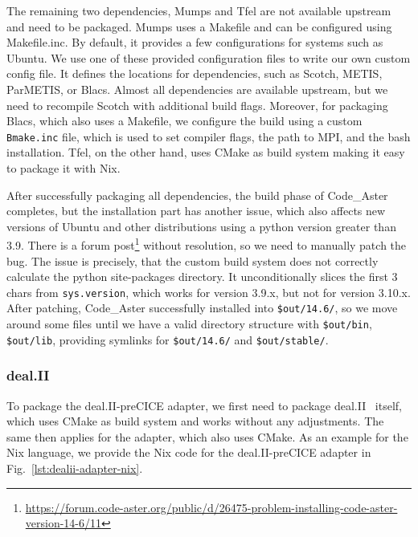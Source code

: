 \documentclass{eceasst}
\begin{document}
The remaining two dependencies, Mumps and Tfel are not available upstream and need to be packaged.
Mumps uses a Makefile and can be configured using Makefile.inc. By default, it provides a few configurations for systems such as Ubuntu. We use one of these provided configuration files to write our own custom config file.
It defines the locations for dependencies, such as Scotch, METIS, ParMETIS, or Blacs.
Almost all dependencies are available upstream, but we need to recompile Scotch with additional build flags.
Moreover, for packaging Blacs, which also uses a Makefile, we configure the build using a custom \texttt{Bmake.inc} file, which is used to set compiler flags, the path to MPI, and the bash installation.
Tfel, on the other hand, uses CMake as build system making it easy to package it with Nix.

After successfully packaging all dependencies, the build phase of Code\_Aster completes, but the installation part has another issue, which also affects new versions of Ubuntu and other distributions using a python version greater than 3.9.
There is a forum post\footnote{\url{https://forum.code-aster.org/public/d/26475-problem-installing-code-aster-version-14-6/11}} without resolution, so we need to manually patch the bug.
The issue is precisely, that the custom build system does not correctly calculate the python site-packages directory. It unconditionally slices the first 3 chars from \texttt{sys.version}, which works for version 3.9.x, but not for version 3.10.x.
After patching, Code\_Aster successfully installed into \texttt{\$out/14.6/}, so we move around some files until we have a valid directory structure with \texttt{\$out/bin}, \texttt{\$out/lib}, providing symlinks for \texttt{\$out/14.6/} and \texttt{\$out/stable/}.

\subsubsection{deal.II}


To package the deal.II-preCICE adapter, we first need to package deal.II~\cite{dealII95} itself, which uses CMake as build system and works without any adjustments.
The same then applies for the adapter, which also uses CMake.
As an example for the Nix language, we provide the Nix code for the deal.II-preCICE adapter in Fig.~\ref{lst:dealii-adapter-nix}.
\end{document}
